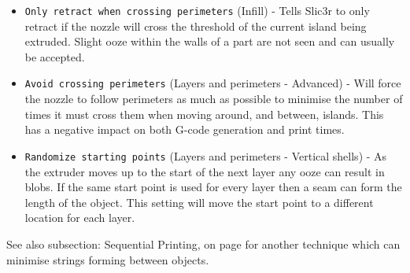\begin{itemize}
    \item \texttt{Only retract when crossing perimeters} (Infill) - Tells Slic3r to only retract if the nozzle will cross the threshold of the current island being extruded.  Slight ooze within the walls of a part are not seen and can usually be accepted.
    \item \texttt{Avoid crossing perimeters} (Layers and perimeters - Advanced) - Will force the nozzle to follow perimeters as much as possible to minimise the number of times it must cross them when moving around, and between, islands.  This has a negative impact on both G-code generation and print times.
    \item \texttt{Randomize starting points} (Layers and perimeters - Vertical shells) - As the extruder moves up to the start of the next layer any ooze can result in blobs.  If the same start point is used for every layer then a seam can form the length of the object.  This setting will move the start point to a different location for each layer.
\end{itemize}


See also subsection: Sequential Printing, on page \pageref{sec:sequential_printing} for another technique which can minimise strings forming between objects.
